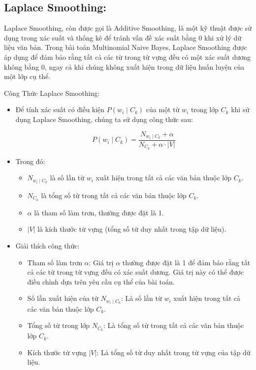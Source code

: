 \subsection{Laplace Smoothing:}

Laplace Smoothing, còn được gọi là Additive Smoothing, là một kỹ thuật được sử dụng trong xác suất và thống kê để tránh vấn đề xác suất bằng 0 khi xử lý dữ liệu văn bản. Trong bài toán Multinomial Naive Bayes, Laplace Smoothing được áp dụng để đảm bảo rằng tất cả các từ trong từ vựng đều có một xác suất dương không bằng 0, ngay cả khi chúng không xuất hiện trong dữ liệu huấn luyện của một lớp cụ thể.

Công Thức Laplace Smoothing:

\begin{itemize}
    \item Để tính xác suất có điều kiện \( P(w_i \mid C_k) \) của một từ \( w_i \) trong lớp \( C_k \) khi sử dụng Laplace Smoothing, chúng ta sử dụng công thức sau:

\[
P(w_i \mid C_k) = \frac{N_{w_i \mid C_k} + \alpha}{N_{C_k} + \alpha \cdot |V|}
\]

    \item Trong đó:
\begin{itemize}
    \item \( N_{w_i \mid C_k} \) là số lần từ \( w_i \) xuất hiện trong tất cả các văn bản thuộc lớp \( C_k \).
    \item \( N_{C_k} \) là tổng số từ trong tất cả các văn bản thuộc lớp \( C_k \).
    \item \( \alpha \) là tham số làm trơn, thường được đặt là 1.
    \item \( |V| \) là kích thước từ vựng (tổng số từ duy nhất trong tập dữ liệu).
\end{itemize}

    \item Giải thích công thức:
\begin{itemize}
    \item Tham số làm trơn \( \alpha \): Giá trị \( \alpha \) thường được đặt là 1 để đảm bảo rằng tất cả các từ trong từ vựng đều có xác suất dương. Giá trị này có thể được điều chỉnh dựa trên yêu cầu cụ thể của bài toán.
    \item Số lần xuất hiện của từ \( N_{w_i \mid C_k} \): Là số lần từ \( w_i \) xuất hiện trong tất cả các văn bản thuộc lớp \( C_k \).
    \item Tổng số từ trong lớp \( N_{C_k} \): Là tổng số từ trong tất cả các văn bản thuộc lớp \( C_k \).
    \item Kích thước từ vựng \( |V| \): Là tổng số từ duy nhất trong từ vựng của tập dữ liệu.
\end{itemize}

\end{itemize}
\clearpage
